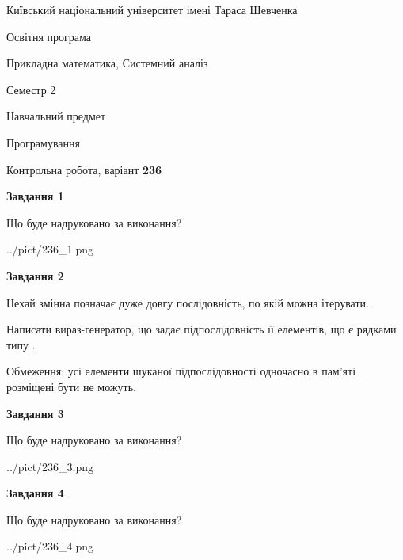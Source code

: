 \documentclass[12pt, ukrainian]{article}
\begin{document}
{{\begin {small}\par
{ \center  Київський національний університет імені Тараса Шевченка \par}
{\parbox {5 cm}{Освітня програма \hfill}{\parbox {8 cm}{Прикладна математика, Системний аналіз \hfill}}\parbox {5 cm}{\hfill Семестр 2}}\par
{\parbox {5 cm} {Навчальний предмет \hfill}\parbox {7 cm}{Програмування \hfill}\parbox {6cm}{\hfill}\par}\vspace{-7pt} \end{small}}{\center Контрольна робота, варіант  \No \textbf
{ 236 }\par}}
{
\begin {large}
{\begin {center}\textbf{Завдання 1}\end {center}}\par
Що буде надруковано за виконання?\par\par
\begin{center}
	{../pict/236_1.png}
\end{center}
\newpage

{\begin {center}\textbf{Завдання 2}\end {center}}\par
Нехай змінна  позначає дуже довгу послідовність, по якій можна ітерувати.

Написати вираз-генератор, що задає підпослідовність її елементів, що є рядками типу .

Обмеження: усі елементи шуканої підпослідовності одночасно в пам'яті розміщені бути не можуть.\par
\newpage

{\begin {center}\textbf{Завдання 3}\end {center}}\par
Що буде надруковано за виконання?
\begin{center}
	{../pict/236_3.png}
\end{center}
\newpage

{\begin {center}\textbf{Завдання 4}\end {center}}\par
Що буде надруковано за виконання?\par
\begin{center}
	{../pict/236_4.png}
\end{center}
\newpage


\end{large}}
\end{document}
